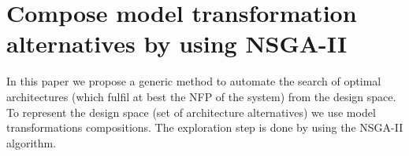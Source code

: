 \documentclass[conference]{IEEEtran}
\begin{document}


\section{Compose model transformation alternatives by using NSGA-II}
\label{Adapting}

In this paper we propose a generic method to automate the search of optimal architectures (which fulfil at best the NFP of the system) from the design space. To represent the design space (set of architecture alternatives) we use model transformations compositions. The exploration step is done by using the NSGA-II algorithm.
\end{document}
